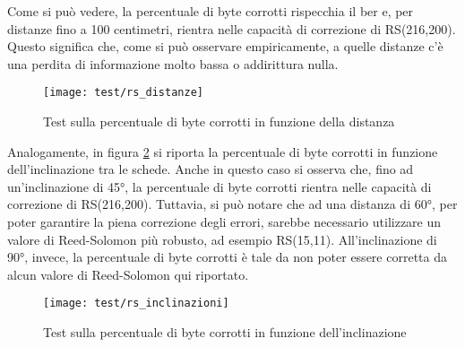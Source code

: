 Come si può vedere, la percentuale di byte corrotti rispecchia il \gls{ber} e, per distanze fino a 100 centimetri, rientra nelle capacità di correzione di RS(216,200). Questo significa che, come si può osservare empiricamente, a quelle distanze c'è una perdita di informazione molto bassa o addirittura nulla.

\begin{figure}[H] 
    \centering 
    \texttt{[image: test/rs\_distanze]} 
    \caption{Test sulla percentuale di byte corrotti in funzione della distanza}
    \label{fig:rs_distanze}
\end{figure}

Analogamente, in figura \ref{fig:rs_inclinazioni} si riporta la percentuale di byte corrotti in funzione dell'inclinazione tra le schede. Anche in questo caso si osserva che, fino ad un'inclinazione di 45°, la percentuale di byte corrotti rientra nelle capacità di correzione di RS(216,200). Tuttavia, si può notare che ad una distanza di 60°, per poter garantire la piena correzione degli errori, sarebbe necessario utilizzare un valore di Reed-Solomon più robusto, ad esempio RS(15,11). All'inclinazione di 90°, invece, la percentuale di byte corrotti è tale da non poter essere corretta da alcun valore di Reed-Solomon qui riportato.

\begin{figure}[H] 
    \centering 
    \texttt{[image: test/rs\_inclinazioni]} 
    \caption{Test sulla percentuale di byte corrotti in funzione dell'inclinazione}
    \label{fig:rs_inclinazioni}
\end{figure}